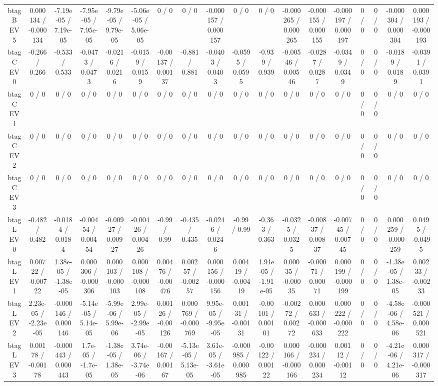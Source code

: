 \documentclass[10pt]{article}
\begin{document}
\begin{table}[htbp]
\begin{center}
\begin{tabular}{|c|c|c|c|c|c|c|c|c|c|c|c|c|c|c|c|c|c|}
  btag B EV 5 & 0.000134 / -0.000134 & -7.19e-05 / 7.19e-05 & -7.95e-05 / 7.95e-05 & -9.79e-05 / 9.79e-05 & -5.06e-05 / 5.06e-05 & 0 / 0 & 0 / 0 & -0.000157 / 0.000157 & 0 / 0 & 0 / 0 & -0.000265 / 0.000265 & -0.000155 / 0.000155 & -0.000197 / 0.000197 & 0 / 0 & 0 / 0 & -0.000304 / 0.000304 & 0.000193 / -0.000193 \\ 
  btag C EV 0 & -0.266 / 0.266 & -0.533 / 0.533 & -0.0473 / 0.0473 & -0.0216 / 0.0216 & -0.0159 / 0.0159 & -0.00137 / 0.00137 & -0.881 / 0.881 & -0.0403 / 0.0403 & -0.0595 / 0.0595 & -0.939 / 0.939 & -0.00546 / 0.00546 & -0.0287 / 0.0287 & -0.0349 / 0.0349 & 0 / 0 & 0 / 0 & -0.0189 / 0.0189 & -0.0391 / 0.0391 \\ 
  btag C EV 1 & 0 / 0 & 0 / 0 & 0 / 0 & 0 / 0 & 0 / 0 & 0 / 0 & 0 / 0 & 0 / 0 & 0 / 0 & 0 / 0 & 0 / 0 & 0 / 0 & 0 / 0 & 0 / 0 & 0 / 0 & 0 / 0 & 0 / 0 \\ 
  btag C EV 2 & 0 / 0 & 0 / 0 & 0 / 0 & 0 / 0 & 0 / 0 & 0 / 0 & 0 / 0 & 0 / 0 & 0 / 0 & 0 / 0 & 0 / 0 & 0 / 0 & 0 / 0 & 0 / 0 & 0 / 0 & 0 / 0 & 0 / 0 \\ 
  btag C EV 3 & 0 / 0 & 0 / 0 & 0 / 0 & 0 / 0 & 0 / 0 & 0 / 0 & 0 / 0 & 0 / 0 & 0 / 0 & 0 / 0 & 0 / 0 & 0 / 0 & 0 / 0 & 0 / 0 & 0 / 0 & 0 / 0 & 0 / 0 \\ 
  btag L EV 0 & -0.482 / 0.482 & -0.0184 / 0.0184 & -0.00454 / 0.00454 & -0.00927 / 0.00927 & -0.00426 / 0.00426 & -0.99 / 0.99 & -0.435 / 0.435 & -0.0246 / 0.0246 & -0.99 / 0.99 & -0.363 / 0.363 & -0.0325 / 0.0325 & -0.00837 / 0.00837 & -0.00745 / 0.00745 & 0 / 0 & 0 / 0 & 0.000259 / -0.000259 & 0.0495 / -0.0495 \\ 
  btag L EV 1 & 0.00722 / -0.00722 & 1.38e-05 / -1.38e-05 & 0.000306 / -0.000306 & 0.000103 / -0.000103 & 0.000108 / -0.000108 & 0.00476 / -0.00476 & 0.00257 / -0.00257 & 0.000156 / -0.000156 & 0.00419 / -0.00419 & 1.91e-05 / -1.91e-05 & 0.00035 / -0.00035 & -0.00071 / 0.00071 & 0.000199 / -0.000199 & 0 / 0 & 0 / 0 & -1.38e-05 / 1.38e-05 & 0.00233 / -0.00233 \\ 
  btag L EV 2 & 2.23e-05 / -2.23e-05 & -0.000146 / 0.000146 & -5.14e-05 / 5.14e-05 & -5.99e-06 / 5.99e-06 & 2.99e-05 / -2.99e-05 & 0.00126 / -0.00126 & 0.000769 / -0.000769 & 9.95e-05 / -9.95e-05 & 0.00131 / -0.00131 & -0.00101 / 0.00101 & -0.00272 / 0.00272 & 0.000633 / -0.000633 & 0.000222 / -0.000222 & 0 / 0 & 0 / 0 & -4.58e-06 / 4.58e-06 & -0.000521 / 0.000521 \\ 
  btag L EV 3 & 0.00178 / -0.00178 & -0.000443 / 0.000443 & 1.7e-05 / -1.7e-05 & -1.38e-05 / 1.38e-05 & 3.74e-06 / -3.74e-06 & -0.00167 / 0.00167 & -5.13e-05 / 5.13e-05 & 3.61e-05 / -3.61e-05 & -0.000985 / 0.000985 & -0.00122 / 0.00122 & 0.000166 / -0.000166 & -0.000234 / 0.000234 & 0.00112 / -0.00112 & 0 / 0 & 0 / 0 & -4.21e-06 / 4.21e-06 & 0.000317 / -0.000317 \\ 

\end{tabular}
\end{center}
\end{table}
\end{document}

